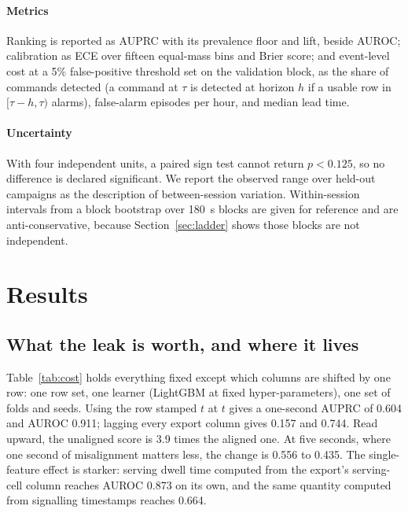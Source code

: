\documentclass[5p,times,twocolumn]{elsarticle}
\begin{document}
\paragraph{Metrics} Ranking is reported as AUPRC with its prevalence floor and lift, beside AUROC; calibration as ECE over fifteen equal-mass bins and Brier score; and event-level cost at a 5\% false-positive threshold set on the validation block, as the share of commands detected (a command at $\tau$ is detected at horizon $h$ if a usable row in $[\tau-h,\tau)$ alarms), false-alarm episodes per hour, and median lead time.

\paragraph{Uncertainty} With four independent units, a paired sign test cannot return $p < 0.125$, so no difference is declared significant. We report the observed range over held-out campaigns as the description of between-session variation. Within-session intervals from a block bootstrap over 180~s blocks are given for reference and are anti-conservative, because Section~\ref{sec:ladder} shows those blocks are not independent.

\section{Results}
\label{sec:results}

\subsection{What the leak is worth, and where it lives}
\label{sec:cost}

Table~\ref{tab:cost} holds everything fixed except which columns are shifted by one row: one row set, one learner (LightGBM at fixed hyper-parameters), one set of folds and seeds. Using the row stamped $t$ at $t$ gives a one-second AUPRC of 0.604 and AUROC 0.911; lagging every export column gives 0.157 and 0.744. Read upward, the unaligned score is 3.9 times the aligned one. At five seconds, where one second of misalignment matters less, the change is 0.556 to 0.435. The single-feature effect is starker: serving dwell time computed from the export's serving-cell column reaches AUROC 0.873 on its own, and the same quantity computed from signalling timestamps reaches 0.664.
\end{document}
